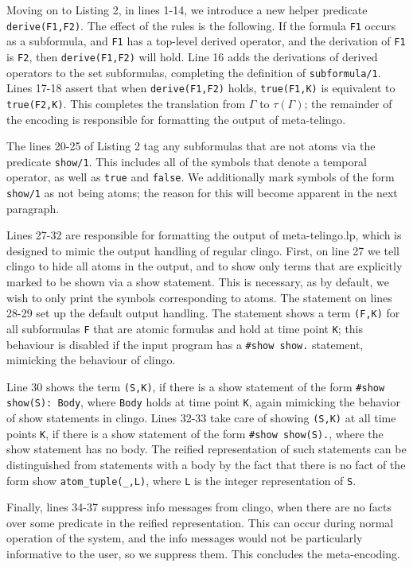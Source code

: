 Moving on to Listing 2, in lines 1-14, we introduce a new helper
predicate \verb|derive(F1,F2)|. The effect of the rules is the
following. If the formula \verb|F1| occurs as a subformula, and
\verb|F1| has a top-level derived operator, and the derivation of
\verb|F1| is \verb|F2|, then \verb|derive(F1,F2)| will hold. Line 16
adds the derivations of derived operators to the set subformulas,
completing the definition of \verb|subformula/1|. Lines 17-18 assert
that when \verb|derive(F1,F2)| holds, \verb|true(F1,K)| is equivalent
to \verb|true(F2,K)|. This completes the translation from $\Gamma$ to
$\tau(\Gamma)$; the remainder of the encoding is responsible for
formatting the output of meta-telingo.

The lines 20-25 of Listing 2 tag any subformulas that are not atoms
via the predicate \verb|show/1|. This includes all of the symbols that
denote a temporal operator, as well as \verb|true| and
\verb|false|. We additionally mark symbols of the form \verb|show/1|
as not being atoms; the reason for this will become apparent in the
next paragraph.

Lines 27-32 are responsible for formatting the output of
meta-telingo.lp, which is designed to mimic the output handling of
regular clingo. First, on line 27 we tell clingo to hide all atoms in
the output, and to show only terms that are explicitly marked to be
shown via a show statement. This is necessary, as by default, we wish
to only print the symbols corresponding to atoms. The statement on
lines 28-29 set up the default output handling. The statement shows a
term \verb|(F,K)| for all subformulas \verb|F| that are atomic
formulas and hold at time point \verb|K|; this behaviour is disabled
if the input program has a \verb|#show show.| statement, mimicking the
behaviour of clingo.

Line 30 shows the term \verb|(S,K)|, if there is a show statement of
the form \verb|#show show(S): Body|, where \verb|Body| holds at time
point \verb|K|, again mimicking the behavior of show statements in
clingo. Lines 32-33 take care of showing \verb|(S,K)| at all time
points \verb|K|, if there is a show statement of the form
\verb|#show show(S).|, where the show statement has no body. The
reified representation of such statements can be distinguished from
statements with a body by the fact that there is no fact of the form
show \verb|atom_tuple(_,L)|, where \verb|L| is the integer
representation of \verb|S|.

Finally, lines 34-37 suppress info messages from clingo, when there
are no facts over some predicate in the reified representation. This
can occur during normal operation of the system, and the info messages
would not be particularly informative to the user, so we suppress
them. This concludes the meta-encoding.

